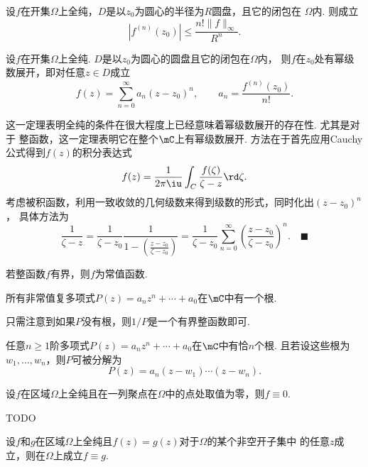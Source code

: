   \begin{cor}
    设$f$在开集$\Omega$上全纯，$D$是以$z_0$为圆心的半径为$R$圆盘，且它的闭包在
    $\Omega$内. 则成立
    \[
      |f^{(n)}(z_0)| \le \frac{n!\|f\|_\infty}{R^n}.
    \]
  \end{cor}

  \begin{thm}[幂级数展开]
    设$f$在开集$\Omega$上全纯. $D$是以$z_0$为圆心的圆盘且它的闭包在$\Omega$内，
    则$f$在$z_0$处有幂级数展开，即对任意$z\in D$成立
    \[
      f(z) = \sum_{n=0}^\infty a_n(z-z_0)^n,\qquad
      a_n = \frac{f^{(n)}(z_0)}{n!}.
    \]
  \end{thm}
  \remark
    这一定理表明全纯的条件在很大程度上已经意味着幂级数展开的存在性. 尤其是对于
    整函数，这一定理表明它在整个$\mC$上有幂级数展开.
  \proof
    方法在于首先应用Cauchy公式得到$f(z)$的积分表达式
    \[
      f(z) = \frac{1}{2\pi\iu}\int_C\frac{f(\zeta)}{\zeta-z}\rd\zeta.
    \]
    考虑被积函数，利用一致收敛的几何级数来得到级数的形式，同时化出$(z-z_0)^n$，
    具体方法为
    \[
      \frac{1}{\zeta-z} = \frac{1}{\zeta-z_0}\frac{1}{1-(\frac{z-z_0}{\zeta-z_0})}
      = \frac{1}{\zeta-z_0}\sum_{n=0}^\infty\left(\frac{z-z_0}{\zeta-z_0}\right)^n.
      \quad\blacksquare
    \]

  \begin{cor}[Liouville]
    若整函数$f$有界，则$f$为常值函数.
  \end{cor}

  \begin{cor}
    所有非常值复多项式$P(z)=a_nz^n + \cdots + a_0$在$\mC$中有一个根.
  \end{cor}
  \proof
    只需注意到如果$P$没有根，则$1/P$是一个有界整函数即可.

  \begin{cor}
    任意$n\ge 1$阶多项式$P(z)=a_nz^n + \cdots + a_0$在$\mC$中有恰$n$个根.
    且若设这些根为$w_1,\dots,w_n$，则$P$可被分解为
    \[
      P(z) = a_n(z-w_1)\cdots(z-w_n).
    \]
  \end{cor}
  \proof

  \begin{thm}
    设$f$在区域$\Omega$上全纯且在一列聚点在$\Omega$中的点处取值为零，则$f\equiv 0$.
  \end{thm}
  \proof
    TODO

  \begin{cor}
    设$f$和$g$在区域$\Omega$上全纯且$f(z)=g(z)$对于$\Omega$的某个非空开子集中
    的任意$z$成立，则在$\Omega$上成立$f\equiv g$.
  \end{cor}

